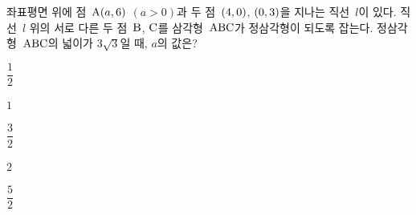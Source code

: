 좌표평면 위에 점~$\mathrm{A}(a{,}\mkern3mu 6)$ $(a>0)$과 두 점~$(4{,}\mkern3mu 0)$, $(0{,}\mkern3mu 3)$을 지나는 직선~$l$이 있다. 직선~$l$ 위의 서로 다른 두 점~$\mathrm{B}$, $\mathrm{C}$를 삼각형~$\mathrm{ABC}$가 정삼각형이 되도록 잡는다. 정삼각형~$\mathrm{ABC}$의 넓이가 $3\sqrt3$일 때, $a$의 값은?
\begin{choices32}{\rule[-3ex]{0pt}{8ex}$\dfrac12$}{\rule[-3ex]{0pt}{8ex}$1$}{\rule[-3ex]{0pt}{8ex}$\dfrac32$}{\rule[-3ex]{0pt}{8ex}$2$}{\rule[-3ex]{0pt}{8ex}$\dfrac52$}\end{choices32}
